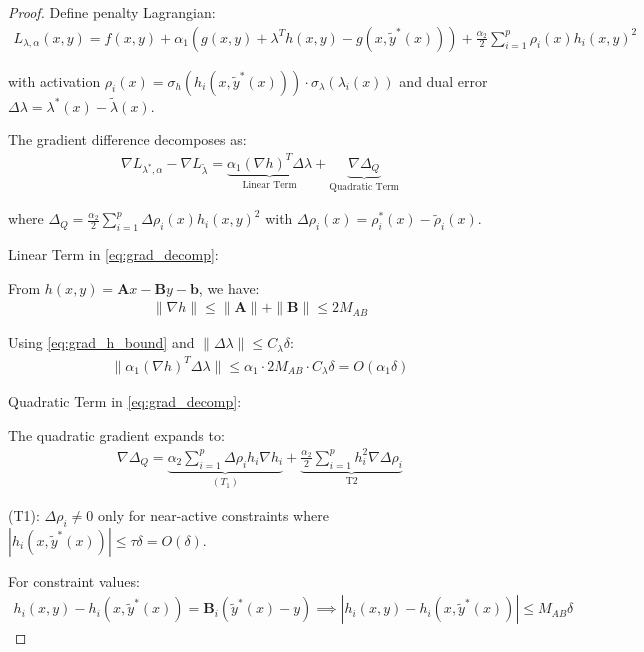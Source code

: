 \documentclass[letterpaper]{article} %
\newcommand{\1}{\mathbf{1}}
\begin{document}
\dualextraction*
\begin{proof}
Define penalty Lagrangian:
\begin{align}
L_{\lambda,\alpha}(x,y) = f(x, y) + \alpha_1(g(x, y) + \lambda^T h(x, y) - g(x, \tilde{y}^*(x))) + \frac{\alpha_2}{2} \sum_{i=1}^{p} \rho_i(x) h_i(x, y)^2 \label{eq:lag_def}
\end{align}

with activation $\rho_i(x) = \sigma_h(h_i(x, \tilde{y}^*(x))) \cdot \sigma_\lambda(\lambda_i(x))$ and dual error $\Delta \lambda = \lambda^*(x) - \tilde{\lambda}(x)$.

The gradient difference decomposes as:
\begin{align}
\nabla L_{\lambda^*, \alpha} - \nabla L_{\tilde{\lambda}} = \underbrace{\alpha_1 (\nabla h)^T \Delta \lambda}_{\text{Linear Term}} + \underbrace{\nabla \Delta_Q}_{\text{Quadratic Term}} \label{eq:grad_decomp}
\end{align}

where $\Delta_Q = \frac{\alpha_2}{2}\sum_{i=1}^{p}\Delta\rho_i(x) h_i(x,y)^2$ with $\Delta\rho_i(x) = \rho_i^*(x) - \tilde{\rho}_i(x)$.

Linear Term in \eqref{eq:grad_decomp}:

From $h(x,y) = \mathbf{A}x - \mathbf{B}y - \mathbf{b}$, we have:
\begin{align}
\|\nabla h\| \leq \|\mathbf{A}\| + \|\mathbf{B}\| \leq 2M_{AB} \label{eq:grad_h_bound}
\end{align}

Using \eqref{eq:grad_h_bound} and $\|\Delta \lambda\| \leq C_\lambda \delta$:
\begin{align}
\|\alpha_1 (\nabla h)^T \Delta \lambda\| \leq \alpha_1 \cdot 2M_{AB} \cdot C_\lambda \delta = O(\alpha_1 \delta) \label{eq:linear_bound}
\end{align}

Quadratic Term in \eqref{eq:grad_decomp}:

The quadratic gradient expands to:
\begin{align}
\nabla\Delta_Q = \underbrace{\alpha_2\sum_{i=1}^{p}\Delta\rho_i h_i \nabla h_i}_{\text{$(T_1)$}} + \underbrace{\frac{\alpha_2}{2}\sum_{i=1}^{p}h_i^2 \nabla\Delta\rho_i}_{\text{T2}} \label{eq:quad_decomp}
\end{align}

(T1): $\Delta\rho_i \neq 0$ only for near-active constraints where $|h_i(x,\tilde{y}^*(x))| \leq \tau\delta = O(\delta)$.

For constraint values:
\begin{align}
h_i(x,y) - h_i(x,\tilde{y}^*(x)) = \mathbf{B}_i(\tilde{y}^*(x) - y) \implies |h_i(x,y) - h_i(x,\tilde{y}^*(x))| \leq M_{AB} \delta \label{eq:h_diff}
\end{align}


\end{proof}
\end{document}
